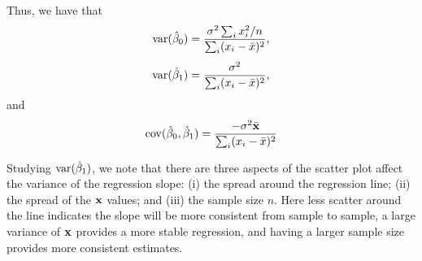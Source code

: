 \vb
Thus, we have that
$$
\mathrm{var}(\hat{\beta}_0) = \frac{\sigma^2\sum_i x_i^2/n}{\sum_i (x_i - {\bar x})^2},
$$
$$
\mathrm{var}(\hat{\beta}_1) = \frac{\sigma^2}{\sum_i (x_i - {\bar x})^2},
$$
and
$$
\mathrm{cov}(\hat{\beta}_0,\hat{\beta}_1) = \frac{-\sigma^2 {\bar {\mathbf{x}}}}{\sum_i (x_i - {\bar x})^2}
$$
\esexa

Studying $\mathrm{var}(\hat{\beta}_1)$, we note that there are three aspects of the scatter plot affect the variance of the regression slope: (i) the spread around the regression line; (ii) the spread of the $\mathbf{x}$ values; and (iii) the sample size $n$. Here less scatter around the line indicates the slope will be more consistent from sample to sample, a large variance of $\mathbf{x}$ provides a more stable regression, and having a larger sample size provides more consistent estimates.


%
%

